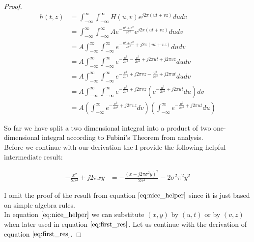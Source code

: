 \documentclass{paper}
\begin{document}
\begin{proof}


\begin{align}
    h(t,z) &= \int_{-\infty}^{\infty} \int_{-\infty}^{\infty} H(u,v) e^{j 2 \pi (ut + vz)} du dv \\
    &= \int_{-\infty}^{\infty} \int_{-\infty}^{\infty} A e^{-\frac{u^2 + v^2}{2 \sigma^2}} e^{j 2 \pi (ut + vz)} du dv \\
    &= A \int_{-\infty}^{\infty} \int_{-\infty}^{\infty} e^{-\frac{u^2 + v^2}{2 \sigma^2} + j 2 \pi (ut + vz)} du dv \\
    &= A \int_{-\infty}^{\infty} \int_{-\infty}^{\infty} e^{-\frac{u^2}{2 \sigma^2}-\frac{v^2}{2 \sigma^2} + j 2 \pi ut + j 2 \pi vz} du dv \\
    &= A \int_{-\infty}^{\infty} \int_{-\infty}^{\infty} e^{-\frac{v^2}{2 \sigma^2} + j 2 \pi vz -\frac{u^2}{2 \sigma^2} + j 2 \pi ut} du dv \\
    &= A \int_{-\infty}^{\infty} \int_{-\infty}^{\infty} e^{-\frac{v^2}{2 \sigma^2} + j 2 \pi vz} \left(e^{-\frac{u^2}{2 \sigma^2} + j 2 \pi ut} du \right) dv \\
    &= A \left(\int_{-\infty}^{\infty} e^{-\frac{v^2}{2 \sigma^2} + j 2 \pi vz} dv \right) \left( \int_{-\infty}^{\infty} e^{-\frac{u^2}{2 \sigma^2} + j 2 \pi ut} du \right)
\label{eq:first_res}
\end{align}

So far we have split a two dimensional integral into a product of two one-dimensional integral according to Fubini's Theorem from analysis. \\

Before we continue with our derivation the I provide the following helpful intermediate result:

\begin{align}
    -\frac{x^2}{2\sigma^2} + j 2\pi x y &= -\frac{(x - j 2 \pi \sigma^2 y)^2}{2 \sigma^2} - 2\sigma^2 \pi^2 y^2
\label{eq:nice_helper}
\end{align}

I omit the proof of the result from equation $\ref{eq:nice_helper}$ since it is just based on simple algebra rules. \\

In equation $\ref{eq:nice_helper}$ we can substitute $(x,y)$ by $(u,t)$ or by $(v,z)$ when later used in equation $\ref{eq:first_res}$. Let us continue with the derivation of equation $\ref{eq:first_res}$.


\end{proof}
\end{document}
